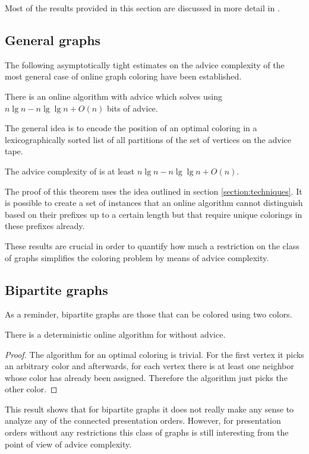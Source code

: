 
Most of the results provided in this section are discussed in more detail
in \cite{misof-trivial-graphs}.

\subsection{General graphs}

The following asymptotically tight estimates on the advice complexity of
the most general case of online graph coloring have been established.

\begin{theorem}\label{theorem:general-graphs-upper}
    There is an online algorithm with advice which solves
     using $n \lg n - n \lg\lg n + O(n)$ bits of
    advice.
\end{theorem}

The general idea is to encode the position of an optimal coloring in a
lexicographically sorted list of all partitions of the set of vertices on
the advice tape.

\begin{theorem}\label{theorem:general-graphs-lower}
    The advice complexity of  is at least $n \lg n - n
    \lg\lg n + O(n)$.
\end{theorem}

The proof of this theorem uses the idea outlined in section
\ref{section:techniques}. It is possible to create a set of instances that
an online algorithm cannot distinguish based on their prefixes up to a
certain length but that require unique colorings in these prefixes
already.

These results are crucial in order to quantify how much a restriction on
the class of graphs simplifies the coloring problem by means of advice
complexity.

\subsection{Bipartite graphs}

As a reminder, bipartite graphs are those that can be colored using two
colors.

\begin{theorem}\label{theorem:bipartite-connected}
    There is a deterministic online algorithm for
     without advice.
\end{theorem}

\begin{proof}
    The algorithm for an optimal coloring is trivial. For the first vertex
    it picks an arbitrary color and afterwards, for each vertex there is
    at least one neighbor whose color has already been assigned. Therefore
    the algorithm just picks the other color.
\end{proof}

This result shows that for bipartite graphs it does not really make any
sense to analyze any of the connected presentation orders. However, for
presentation orders without any restrictions this class of graphs is still
interesting from the point of view of advice complexity.
